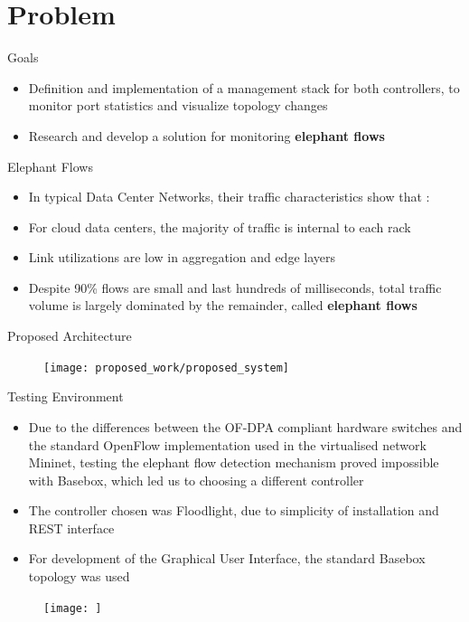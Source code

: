 \documentclass{beamer}
\begin{document}
\section{Problem}

\begin{frame}{Goals}
    \begin{itemize}
        \item Definition and implementation of a management stack for both controllers, to monitor port statistics and visualize topology changes
            \pause 
        \item Research and develop a solution for monitoring \textbf{elephant flows}
    \end{itemize}
\end{frame}

\begin{frame}{Elephant Flows}
    \begin{itemize}
        \item In typical Data Center Networks, their traffic characteristics show that \cite{mori_identifying_2004}:
            \pause
        \item For cloud data centers, the majority of traffic is internal to each rack
            \pause
        \item Link utilizations are low in aggregation and edge layers
            \pause
        \item Despite 90\% flows are small and last hundreds of milliseconds, total traffic volume is largely dominated by the remainder, called 
            \textbf{elephant flows} \cite{benson_network_2010}
    \end{itemize}
\end{frame}

\begin{frame}{Proposed Architecture}
        \begin{figure}
            \texttt{[image: proposed\_work/proposed\_system]}
        \end{figure}
\end{frame}

\begin{frame}{Testing Environment}
    \begin{itemize}
        \item Due to the differences between the OF-DPA compliant hardware switches and the standard OpenFlow implementation used in the virtualised 
            network Mininet, testing the elephant flow detection mechanism proved impossible with Basebox, which led us to choosing a different controller
            \pause 
        \item The controller chosen was Floodlight, due to simplicity of installation and REST interface
        \item For development of the Graphical User Interface, the standard Basebox topology was used
    \end{itemize}
    \begin{figure}
        \texttt{[image: ]}
    \end{figure}
\end{frame}
\end{document}
